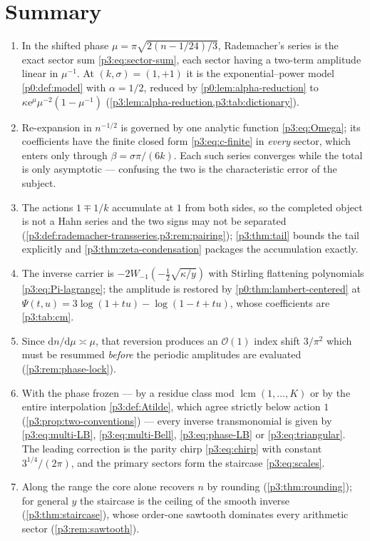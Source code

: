 \documentclass[11pt,a4paper,oneside]{book}
\theoremstyle{plain}
\theoremstyle{definition}
\theoremstyle{remark}
\newcommand{\e}{\mathrm{e}}
\newcommand{\dd}{\mathrm{d}}
\newcommand{\bigO}{\mathcal{O}}
\newcommand{\Wlam}{W}
\begin{document}
\section{Summary}\label{p3:sec:summary}

\begin{enumerate}
\item In the shifted phase $\mu=\pi\sqrt{2(n-1/24)/3}$, Rademacher's series is the exact
sector sum \cref{p3:eq:sector-sum}, each sector having a two-term amplitude linear in $\mu^{-1}$.
At $(k,\sigma)=(1,+1)$ it is the exponential--power model \cref{p0:def:model} with $\alpha=1/2$,
reduced by \cref{p0:lem:alpha-reduction} to $\kappa\e^{\mu}\mu^{-2}(1-\mu^{-1})$
(\cref{p3:lem:alpha-reduction,p3:tab:dictionary}).
\item Re-expansion in $n^{-1/2}$ is governed by one analytic function \cref{p3:eq:Omega};
its coefficients have the finite closed form \cref{p3:eq:c-finite} in \emph{every} sector, which
enters only through $\beta=\sigma\pi/(6k)$. Each such series converges while the total is only
asymptotic --- confusing the two is the characteristic error of the subject.
\item The actions $1\mp1/k$ accumulate at $1$ from both sides, so the completed object is
not a Hahn series and the two signs may not be separated
(\cref{p3:def:rademacher-transseries,p3:rem:pairing}); \cref{p3:thm:tail} bounds the tail
explicitly and \cref{p3:thm:zeta-condensation} packages the accumulation exactly.
\item The inverse carrier is $-2\Wlam_{-1}(-\tfrac12\sqrt{\kappa/y})$ with Stirling
flattening polynomials \cref{p3:eq:Pi-lagrange}; the amplitude is restored by
\cref{p0:thm:lambert-centered} at $\Psi(t,u)=3\log(1+tu)-\log(1-t+tu)$, whose coefficients are
\cref{p3:tab:cm}.
\item Since $\dd n/\dd\mu\asymp\mu$, that reversion produces an $\bigO(1)$ index
shift $3/\pi^{2}$ which must be resummed \emph{before} the periodic amplitudes are evaluated
(\cref{p3:rem:phase-lock}).
\item With the phase frozen --- by a residue class mod $\operatorname{lcm}(1,\dots,K)$ or
by the entire interpolation \cref{p3:def:Atilde}, which agree strictly below action $1$
(\cref{p3:prop:two-conventions}) --- every inverse transmonomial is given by
\cref{p3:eq:multi-LB}, \cref{p3:eq:multi-Bell}, \cref{p3:eq:phase-LB} or \cref{p3:eq:triangular}.
The leading correction is the parity chirp \cref{p3:eq:chirp} with constant $3^{1/4}/(2\pi)$, and
the primary sectors form the staircase \cref{p3:eq:scales}.
\item Along the range the core alone recovers $n$ by rounding
(\cref{p3:thm:rounding}); for general $y$ the staircase is the ceiling of the smooth inverse
(\cref{p3:thm:staircase}), whose order-one sawtooth dominates every arithmetic sector
(\cref{p3:rem:sawtooth}).
\end{enumerate}
\end{document}
